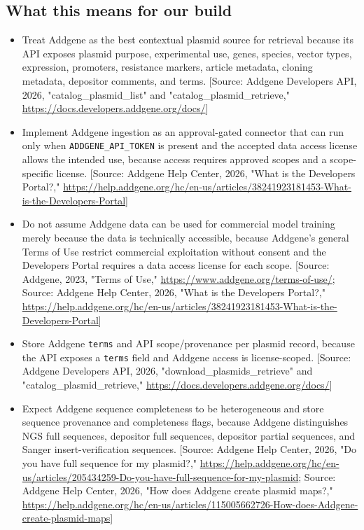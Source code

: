 \documentclass[11pt]{report}
\begin{document}
\subsection{What this means for our build}
\begin{itemize}
\item Treat Addgene as the best contextual plasmid source for retrieval because its API exposes plasmid purpose, experimental use, genes, species, vector types, expression, promoters, resistance markers, article metadata, cloning metadata, depositor comments, and terms. [Source: Addgene Developers API, 2026, "catalog\_plasmid\_list" and "catalog\_plasmid\_retrieve," \url{https://docs.developers.addgene.org/docs/}]
\item Implement Addgene ingestion as an approval-gated connector that can run only when \texttt{ADDGENE\_API\_TOKEN} is present and the accepted data access license allows the intended use, because access requires approved scopes and a scope-specific license. [Source: Addgene Help Center, 2026, "What is the Developers Portal?," \url{https://help.addgene.org/hc/en-us/articles/38241923181453-What-is-the-Developers-Portal}]
\item Do not assume Addgene data can be used for commercial model training merely because the data is technically accessible, because Addgene's general Terms of Use restrict commercial exploitation without consent and the Developers Portal requires a data access license for each scope. [Source: Addgene, 2023, "Terms of Use," \url{https://www.addgene.org/terms-of-use/}; Source: Addgene Help Center, 2026, "What is the Developers Portal?," \url{https://help.addgene.org/hc/en-us/articles/38241923181453-What-is-the-Developers-Portal}]
\item Store Addgene \texttt{terms} and API scope/provenance per plasmid record, because the API exposes a \texttt{terms} field and Addgene access is license-scoped. [Source: Addgene Developers API, 2026, "download\_plasmids\_retrieve" and "catalog\_plasmid\_retrieve," \url{https://docs.developers.addgene.org/docs/}]
\item Expect Addgene sequence completeness to be heterogeneous and store sequence provenance and completeness flags, because Addgene distinguishes NGS full sequences, depositor full sequences, depositor partial sequences, and Sanger insert-verification sequences. [Source: Addgene Help Center, 2026, "Do you have full sequence for my plasmid?," \url{https://help.addgene.org/hc/en-us/articles/205434259-Do-you-have-full-sequence-for-my-plasmid}; Source: Addgene Help Center, 2026, "How does Addgene create plasmid maps?," \url{https://help.addgene.org/hc/en-us/articles/115005662726-How-does-Addgene-create-plasmid-maps}]

\end{itemize}
\end{document}
